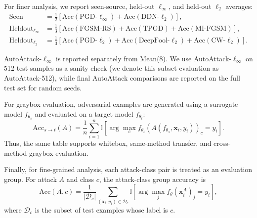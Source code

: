 For finer analysis, we report seen-source, held-out \(\ell_\infty\), and held-out \(\ell_2\)
averages:
\begin{align}
    \mathrm{Seen}
    &=
    \frac{1}{2}
    \left[
        \mathrm{Acc}(\text{PGD-}\ell_\infty)
        +
        \mathrm{Acc}(\text{DDN-}\ell_2)
    \right], \\
    \mathrm{Heldout}_{\ell_\infty}
    &=
    \frac{1}{3}
    \left[
        \mathrm{Acc}(\text{FGSM-RS})
        +
        \mathrm{Acc}(\text{TPGD})
        +
        \mathrm{Acc}(\text{MI-FGSM})
    \right], \\
    \mathrm{Heldout}_{\ell_2}
    &=
    \frac{1}{3}
    \left[
        \mathrm{Acc}(\text{PGD-}\ell_2)
        +
        \mathrm{Acc}(\text{DeepFool-}\ell_2)
        +
        \mathrm{Acc}(\text{CW-}\ell_2)
    \right].
\end{align}

AutoAttack-$\ell_\infty$ is reported separately from Mean(8). We use
AutoAttack-$\ell_\infty$ on 512 test samples as a sanity check (we denote this subset evaluation as AutoAttack-512), while final AutoAttack
comparisons are reported on the full test set for random seeds.

For graybox evaluation, adversarial examples are generated using a surrogate model
\(f_{\theta_s}\) and evaluated on a target model \(f_{\theta_t}\):
\begin{equation}
    \mathrm{Acc}_{s \rightarrow t}(A)
    =
    \frac{1}{n}
    \sum_{i=1}^{n}
    \mathbb{I}
    \left[
        \arg\max_c f_{\theta_t}
        \left(
            A(f_{\theta_s}, \mathbf{x}_i, y_i)
        \right)_c
        =
        y_i
    \right].
    \label{eq:graybox_acc}
\end{equation}
Thus, the same table supports whitebox, same-method transfer, and cross-method graybox
evaluation.

Finally, for fine-grained analysis, each attack-class pair is treated as an evaluation
group. For attack \(A\) and class \(c\), the attack-class group accuracy is
\begin{equation}
    \mathrm{Acc}(A,c)
    =
    \frac{1}{|\mathcal{D}_{c}|}
    \sum_{(\mathbf{x}_i,y_i)\in \mathcal{D}_{c}}
    \mathbb{I}
    \left[
        \arg\max_j f_\theta(\mathbf{x}_i^{A})_j = y_i
    \right],
    \label{eq:attack_class_acc}
\end{equation}
where \(\mathcal{D}_{c}\) is the subset of test examples whose label is \(c\).

